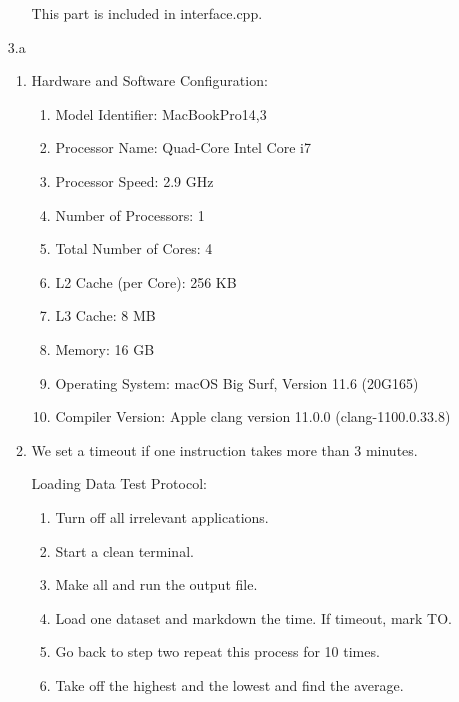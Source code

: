 \documentclass{article}
\begin{document}
\begin{enumerate}
\begin{enumerate}
This part is included in interface.cpp.

\end{enumerate}

\item[3.a]
\begin{enumerate}
\item 

Hardware and Software Configuration:

\begin{enumerate}
\item Model Identifier:	MacBookPro14,3

\item Processor Name:	Quad-Core Intel Core i7

\item Processor Speed:	2.9 GHz

\item Number of Processors:	1

\item Total Number of Cores:	4

\item L2 Cache (per Core):	256 KB

\item L3 Cache:	8 MB

\item Memory:	16 GB

\item Operating System: macOS Big Surf, Version 11.6 (20G165)

\item Compiler Version: Apple clang version 11.0.0 (clang-1100.0.33.8)

\end{enumerate}

\item 

We set a timeout if one instruction takes more than 3 minutes. 

Loading Data Test Protocol:

\begin{enumerate}
\item Turn off all irrelevant applications.
\item Start a clean terminal.
\item Make all and run the output file.
\item Load one dataset and markdown the time. If timeout, mark TO. 
\item Go back to step two repeat this process for 10 times.
\item Take off the highest and the lowest and find the average. 
\end{enumerate}


\end{enumerate}
\end{enumerate}
\end{document}

